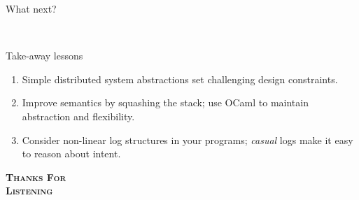 \documentclass[aspectratio=1610]{beamer}
\begin{document}


\begin{frame}{What next?}
  \begin{center}
    
  \end{center}
  \vspace{0.7cm}
  \\\vspace{2mm}
\end{frame}

\begin{frame}{Take-away lessons}
  \begin{enumerate}
  \item \large Simple distributed system abstractions set challenging design constraints.\vspace{3mm}
    \pause
  \item \large Improve semantics by squashing the stack; use OCaml to maintain abstraction and flexibility.\vspace{3mm}
    \pause
  \item \large Consider non-linear log structures in your programs; \emph{casual} logs make it easy to
    reason about intent.
  \end{enumerate}
\end{frame}

\begin{frame}[noframenumbering]
  \begin{center}
    \fontsize{40pt}{50pt}\selectfont \textsc{\textbf{\textcolor{TabBlue}{Thanks For}\\ \textcolor{TabBlue}{Listening}}}
  \end{center}
\end{frame}
\end{document}
